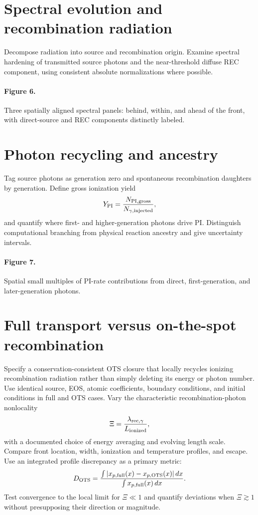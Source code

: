 \documentclass[11pt]{article}
\begin{document}
\section{Spectral evolution and recombination radiation}
Decompose radiation into source and recombination origin. Examine spectral hardening of transmitted source photons and the near-threshold diffuse REC component, using consistent absolute normalizations where possible.
\paragraph{Figure 6.} Three spatially aligned spectral panels: behind, within, and ahead of the front, with direct-source and REC components distinctly labeled.
\section{Photon recycling and ancestry}
Tag source photons as generation zero and spontaneous recombination daughters by generation. Define gross ionization yield
\begin{equation}
Y_{\rm PI}=\frac{N_{\rm PI,gross}}{N_{\gamma,\rm injected}},
\end{equation}
and quantify where first- and higher-generation photons drive PI. Distinguish computational branching from physical reaction ancestry and give uncertainty intervals.
\paragraph{Figure 7.} Spatial small multiples of PI-rate contributions from direct, first-generation, and later-generation photons.
\section{Full transport versus on-the-spot recombination}
Specify a conservation-consistent OTS closure that locally recycles ionizing recombination radiation rather than simply deleting its energy or photon number. Use identical source, EOS, atomic coefficients, boundary conditions, and initial conditions in full and OTS cases. Vary the characteristic recombination-photon nonlocality
\begin{equation}
\Xi=\frac{\lambda_{\rm rec,\gamma}}{L_{\rm ionized}},
\end{equation}
with a documented choice of energy averaging and evolving length scale. Compare front location, width, ionization and temperature profiles, and escape. Use an integrated profile discrepancy as a primary metric:
\begin{equation}
D_{\rm OTS}=\frac{\int |x_{p,\rm full}(x)-x_{p,\rm OTS}(x)|\,dx}{\int x_{p,\rm full}(x)\,dx}.
\end{equation}
Test convergence to the local limit for $\Xi\ll1$ and quantify deviations when $\Xi\gtrsim1$ without presupposing their direction or magnitude.
\end{document}
